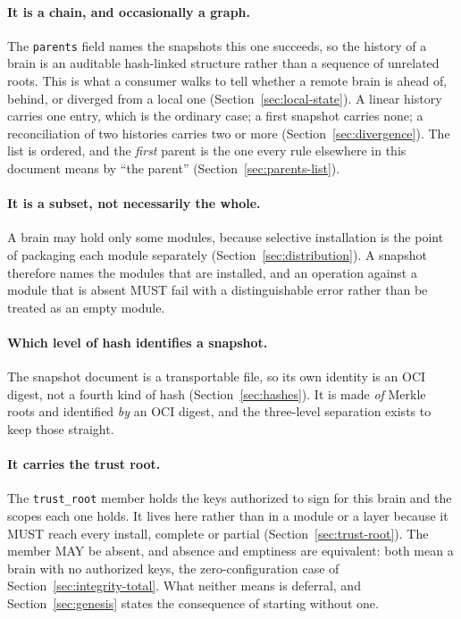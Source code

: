 \documentclass[11pt,a4paper]{article}
\begin{document}
\paragraph{It is a chain, and occasionally a graph.}
The \texttt{parents} field names the snapshots this one succeeds, so the history
of a brain is an auditable hash-linked structure rather than a sequence of
unrelated roots. This is what a consumer walks to tell whether a remote brain is
ahead of, behind, or diverged from a local one
(Section~\ref{sec:local-state}). A linear history carries one entry, which is
the ordinary case; a first snapshot carries none; a reconciliation of two
histories carries two or more (Section~\ref{sec:divergence}). The list is ordered, and the \emph{first} parent is the one every rule
elsewhere in this document means by ``the parent''
(Section~\ref{sec:parents-list}).

\paragraph{It is a subset, not necessarily the whole.}
A brain may hold only some modules, because selective installation is the point
of packaging each module separately (Section~\ref{sec:distribution}). A snapshot
therefore names the modules that are installed, and an operation against a
module that is absent MUST fail with a distinguishable error rather than be
treated as an empty module.

\paragraph{Which level of hash identifies a snapshot.}
The snapshot document is a transportable file, so its own identity is an OCI
digest, not a fourth kind of hash (Section~\ref{sec:hashes}). It is made \emph{of} Merkle roots and identified \emph{by} an OCI digest, and
the three-level separation exists to keep those straight.

\paragraph{It carries the trust root.}
The \texttt{trust\_root} member holds the keys authorized to sign for this
brain and the scopes each one holds. It lives here rather than in a module or
a layer because it MUST reach every install, complete or partial
(Section~\ref{sec:trust-root}). The member MAY be absent, and absence and
emptiness are equivalent: both mean a brain with no authorized keys, the
zero-configuration case of Section~\ref{sec:integrity-total}. What neither
means is deferral, and Section~\ref{sec:genesis} states the consequence of
starting without one.
\end{document}
